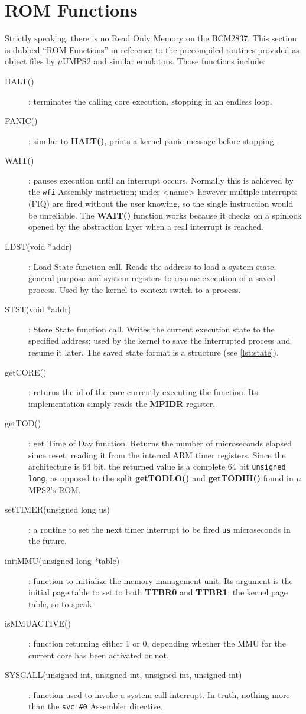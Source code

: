 \documentclass[12pt,a4paper,openright,twoside]{report}
\begin{document}
\section{ROM Functions}
Strictly speaking, there is no Read Only Memory on the BCM2837. This section is 
dubbed ``ROM Functions'' in reference to the precompiled routines provided as 
object files by $\mu$UMPS2 and similar emulators.
Those functions include:
\begin{description}
    \item[HALT()]: terminates the calling core execution, stopping in an endless loop.
    \item[PANIC()]: similar to \textbf{HALT()}, prints a kernel panic message before
        stopping.
    \item[WAIT()]: pauses execution until an interrupt occurs. Normally this is 
        achieved by the {\tt wfi} Assembly instruction; under <name> however multiple
        interrupts (FIQ) are fired without the user knowing, so the single instruction
        would be unreliable. The \textbf{WAIT()} function works because it checks
        on a spinlock opened by the abstraction layer when a real interrupt is 
        reached.
    \item[LDST(void *addr)]: Load State function call. Reads the address to load
        a system state: general purpose and system registers to resume execution
        of a saved process. Used by the kernel to context switch to a process.
    \item[STST(void *addr)]: Store State function call. Writes the current execution
        state to the specified address; used by the kernel to save the interrupted
        process and resume it later. The saved state format is a structure (see
         \ref{lst:state}).
    \item[getCORE()]: returns the id of the core currently executing the function.
        Its implementation simply reads the \textbf{MPIDR} register.
    \item[getTOD()]: get Time of Day function. Returns the number of microseconds
        elapsed since reset, reading it from the internal ARM
        timer registers. Since the architecture is 64 bit, the returned value 
        is a complete 64 bit {\tt unsigned long}, as opposed to the split 
        \textbf{getTODLO()} and \textbf{getTODHI()} found in $\mu$MPS2's ROM.
    \item[setTIMER(unsigned long us)]: a routine to set the next timer interrupt to 
        be fired {\tt us} microseconds in the future.
    \item[initMMU(unsigned long *table)]: function to initialize the memory 
        management unit. Its argument is the initial page table to set to both
        \textbf{TTBR0} and \textbf{TTBR1}; the kernel page table, so to speak.
    \item[isMMUACTIVE()]: function returning either 1 or 0, depending whether
        the MMU for the current core has been activated or not.
    \item[SYSCALL(unsigned int, unsigned int, unsigned int, unsigned int)]:
    function used to invoke a system call interrupt. In truth, nothing more than
    the {\tt svc \#0} Assembler directive.
\end{description}
\end{document}
